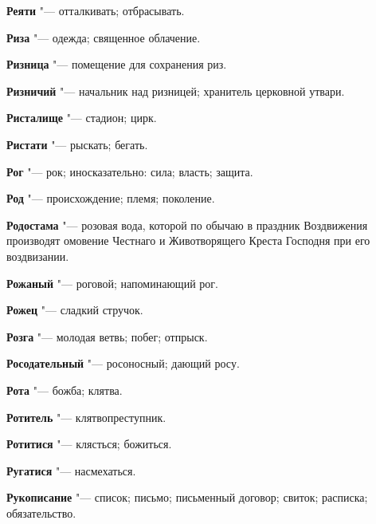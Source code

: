 \begin{mymulticols}{2}
\noindent\textbf{Реяти} "--- отталкивать; отбрасывать. 




\noindent\textbf{Риза} "--- одежда; священное облачение. 




\noindent\textbf{Ризница} "--- помещение для сохранения риз. 




\noindent\textbf{Ризничий} "--- начальник над ризницей; хранитель церковной утвари. 




\noindent\textbf{Ристалище} "--- стадион; цирк. 




\noindent\textbf{Ристати} "--- рыскать; бегать. 




\noindent\textbf{Рог} "--- рок; иносказательно: сила; власть; защита. 




\noindent\textbf{Род} "--- происхождение; племя; поколение. 




\noindent\textbf{Родостама} "--- розовая вода, которой по обычаю в праздник Воздвижения производят омовение Честнаго и Животворящего Креста Господня при его воздвизании. 




\noindent\textbf{Рожаный} "--- роговой; напоминающий рог. 




\noindent\textbf{Рожец} "--- сладкий стручок. 




\noindent\textbf{Розга} "--- молодая ветвь; побег; отпрыск. 




\noindent\textbf{Росодательный} "--- росоносный; дающий росу. 




\noindent\textbf{Рота} "--- божба; клятва. 




\noindent\textbf{Ротитель} "--- клятвопреступник. 




\noindent\textbf{Ротитися} "--- клясться; божиться. 




\noindent\textbf{Ругатися} "--- насмехаться. 




\noindent\textbf{Рукописание} "--- список; письмо; письменный договор; свиток; расписка; обязательство. 





\end{mymulticols}

